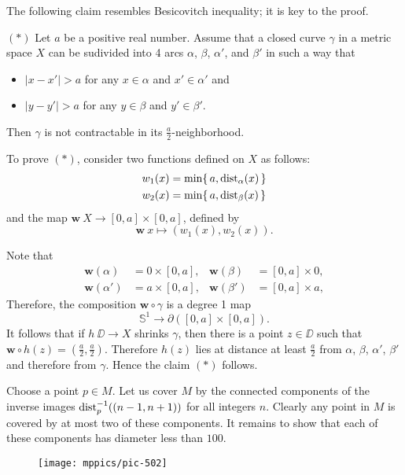 The following claim resembles Besicovitch inequality;
it is key to the proof.
\begin{cl}{$({*})$} Let $a$ be a positive real number.
 Assume that a closed curve $\gamma$ in a metric space $X$ can be sudivided into 4 arcs $\alpha$, $\beta$, $\alpha'$, and $\beta'$ in such a way that 
 \begin{itemize}
 \item $|x-x'|>a$ for any $x\in\alpha$ and $x'\in \alpha'$
 and
 \item $|y-y'|>a$ for any $y\in\beta$ and $y'\in \beta'$.
 \end{itemize}
 Then $\gamma$ is not contractable in its $\tfrac a2$-neighborhood.
\end{cl}


To prove $({*})$, consider two functions defined on $X$ as follows:
\begin{align*}
w_1(x)&=\min \{\,a,\operatorname{\rm dist}\nolimits_{\alpha}(x)\,\}
\\
w_2(x)&=\min \{\,a,\operatorname{\rm dist}\nolimits_{\beta}(x)\,\}
\end{align*}
and the map $\bm{w}\:X\to [0,a]\times[0,a]$, defined by
\[\bm{w}\:x\mapsto(w_1(x),w_2(x)).\]

Note that 
\begin{align*}
\bm{w}(\alpha)&=0\times [0,a],
&
\bm{w}(\beta)&=[0,a]\times 0,
\\
\bm{w}(\alpha')&=a\times [0,a],
&
\bm{w}(\beta')&=[0,a]\times a,
\end{align*} 
Therefore, the composition $\bm{w}\circ\gamma$ is a degree 1 map 
\[\mathbb{S}^1\to \partial([0,a]\times[0,a]).\] 
It follows that if $h\:\DD\to X$ shrinks $\gamma$, then there is a point $z\in\DD$ such that 
$\bm{w}\circ h(z)=(\tfrac a2,\tfrac a2)$.
Therefore $h(z)$ lies at distance at least $\tfrac a2$ from $\alpha$, $\beta$, $\alpha'$, $\beta'$
and therefore from $\gamma$.
Hence the claim $({*})$ follows.

\medskip

Choose a point $p\in M$.
Let us cover $M$ by the connected components of the inverse images 
$\operatorname{\rm dist}\nolimits_p^{-1}((n-1,n+1))$ for all integers $n$.
Clearly any point in $M$ is covered by at most two of these components.
It remains to show that each of these components has diameter less than $100$.

\begin{wrapfigure}{o}{31 mm}
\vskip-2mm
\centering
\texttt{[image: mppics/pic-502]}
\end{wrapfigure}

